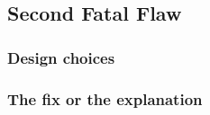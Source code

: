 \subsection{Second Fatal Flaw}

\subsubsection{Design choices}

\subsubsection{The fix or the explanation}